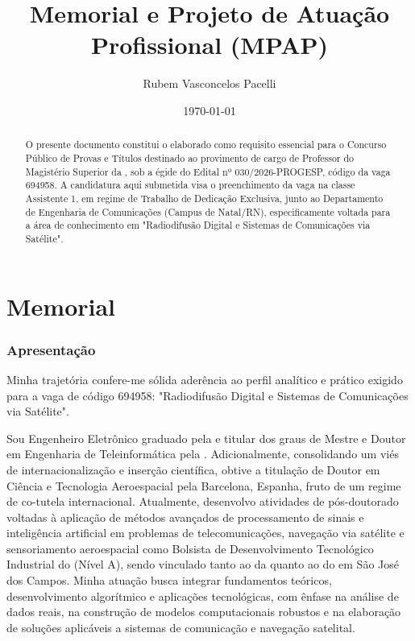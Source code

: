 \documentclass{article}
\title{Memorial e Projeto de Atuação Profissional (MPAP)}
\author[1,2]{Rubem Vasconcelos Pacelli}
\affil[1]{Instituto Tecnológico de Aeronáutica (ITA), São José dos Campos, SP}
\affil[2]{Universidade Federal do Ceará (UFC), Fortaleza, CE}
\date{\today}
\begin{document}
\maketitle

\begin{abstract}
  O presente documento constitui o  elaborado como requisito essencial para o Concurso Público de Provas e Títulos destinado ao provimento de cargo de Professor do Magistério Superior da , sob a égide do Edital nº 030/2026-PROGESP, código da vaga 694958. A candidatura aqui submetida visa o preenchimento da vaga na classe Assistente 1, em regime de Trabalho de Dedicação Exclusiva, junto ao Departamento de Engenharia de Comunicações (Campus de Natal/RN), especificamente voltada para a área de conhecimento em "Radiodifusão Digital e Sistemas de Comunicações via Satélite".
\end{abstract}

\part{Memorial}
\label{part:memorial}

\section{Apresentação}

Minha trajetória confere-me sólida aderência ao perfil analítico e prático exigido para a vaga de código 694958: "Radiodifusão Digital e Sistemas de Comunicações via Satélite".

Sou Engenheiro Eletrônico graduado pela  e titular dos graus de Mestre e Doutor em Engenharia de Teleinformática pela . Adicionalmente, consolidando um viés de internacionalização e inserção científica, obtive a titulação de Doutor em Ciência e Tecnologia Aeroespacial pela  Barcelona, Espanha, fruto de um regime de co-tutela internacional. Atualmente, desenvolvo atividades de pós-doutorado voltadas à aplicação de métodos avançados de processamento de sinais e inteligência artificial em problemas de telecomunicações, navegação via satélite e sensoriamento aeroespacial como Bolsista de Desenvolvimento Tecnológico Industrial do  (Nível A), sendo vinculado tanto ao  da  quanto ao  do  em São José dos Campos. Minha atuação busca integrar fundamentos teóricos, desenvolvimento algorítmico e aplicações tecnológicas, com ênfase na análise de dados reais, na construção de modelos computacionais robustos e na elaboração de soluções aplicáveis a sistemas de comunicação e navegação satelital.
\end{document}
